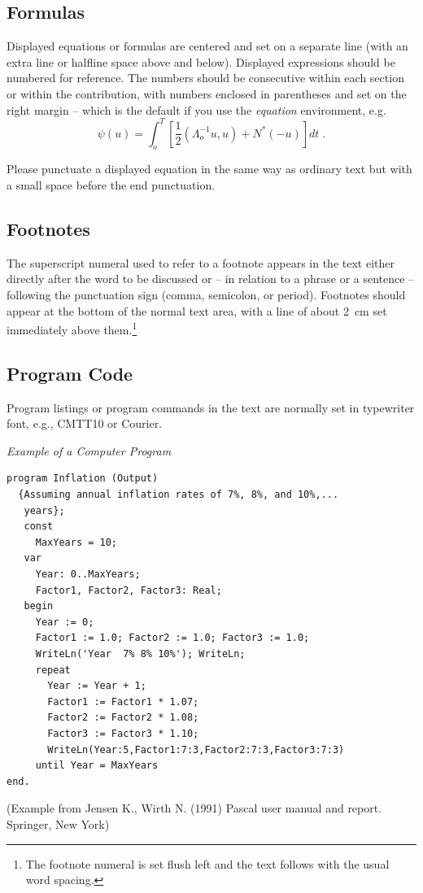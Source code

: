 \documentclass[lnicst,sechang,a4paper]{svmultln}
\begin{document}
\subsection{Formulas}

Displayed equations or formulas are centered and set on a separate
line (with an extra line or halfline space above and below). Displayed
expressions should be numbered for reference. The numbers should be
consecutive within each section or within the contribution,
with numbers enclosed in parentheses and set on the right margin --
which is the default if you use the \emph{equation} environment, e.g.
\begin{equation}
  \psi (u) = \int_{o}^{T} \left[\frac{1}{2}
  \left(\Lambda_{o}^{-1} u,u\right) + N^{\ast} (-u)\right] dt \;  .
\end{equation}

Please punctuate a displayed equation in the same way as ordinary
text but with a small space before the end punctuation.

\subsection{Footnotes}

The superscript numeral used to refer to a footnote appears in the text
either directly after the word to be discussed or -- in relation to a
phrase or a sentence -- following the punctuation sign (comma,
semicolon, or period). Footnotes should appear at the bottom of
the
normal text area, with a line of about 2~cm set
immediately above them.\footnote{The footnote numeral is set flush left
and the text follows with the usual word spacing.}

\subsection{Program Code}

Program listings or program commands in the text are normally set in
typewriter font, e.g., CMTT10 or Courier.

\medskip

\noindent
{\it Example of a Computer Program}
\begin{verbatim}
program Inflation (Output)
  {Assuming annual inflation rates of 7%, 8%, and 10%,...
   years};
   const
     MaxYears = 10;
   var
     Year: 0..MaxYears;
     Factor1, Factor2, Factor3: Real;
   begin
     Year := 0;
     Factor1 := 1.0; Factor2 := 1.0; Factor3 := 1.0;
     WriteLn('Year  7% 8% 10%'); WriteLn;
     repeat
       Year := Year + 1;
       Factor1 := Factor1 * 1.07;
       Factor2 := Factor2 * 1.08;
       Factor3 := Factor3 * 1.10;
       WriteLn(Year:5,Factor1:7:3,Factor2:7:3,Factor3:7:3)
     until Year = MaxYears
end.
\end{verbatim}
%
\noindent
{\small (Example from Jensen K., Wirth N. (1991) Pascal user manual and
report. Springer, New York)}
\end{document}
